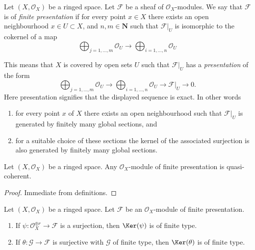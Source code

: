 \begin{definition}
\label{definition-finite-presentation}
Let $(X, \mathcal{O}_X)$ be a ringed space.
Let $\mathcal{F}$ be a sheaf of $\mathcal{O}_X$-modules.
We say that $\mathcal{F}$ is of {\it finite presentation}
if for every point $x \in X$ there exists an open neighbourhood
$x\in U \subset X$, and  $n, m \in \mathbf{N}$ such that $\mathcal{F}|_U$
is isomorphic to the cokernel of a map
$$
\bigoplus\nolimits_{j = 1, \ldots, m}
\mathcal{O}_U
\longrightarrow
\bigoplus\nolimits_{i = 1, \ldots, n}
\mathcal{O}_U
$$
\end{definition}

\noindent
This means that $X$ is covered by open sets $U$
such that $\mathcal{F}|_U$ has a {\it presentation}
of the form
$$
\bigoplus\nolimits_{j = 1, \ldots, m}
\mathcal{O}_U
\longrightarrow
\bigoplus\nolimits_{i = 1, \ldots, n}
\mathcal{O}_U
\to
\mathcal{F}|_U
\to
0.
$$
Here presentation signifies that the displayed
sequence is exact. In other words
\begin{enumerate}
\item for every point $x$ of $X$ there exists
an open neighbourhood such that $\mathcal{F}|_U$
is generated by finitely many global sections, and
\item for a suitable choice of these sections
the kernel of the associated surjection is also
generated by finitely many global sections.
\end{enumerate}

\begin{lemma}
\label{lemma-finite-presentation-quasi-coherent}
Let $(X, \mathcal{O}_X)$ be a ringed space.
Any $\mathcal{O}_X$-module of finite presentation
is quasi-coherent.
\end{lemma}

\begin{proof}
Immediate from definitions.
\end{proof}

\begin{lemma}
\label{lemma-kernel-surjection-finite-free-onto-finite-presentation}
Let $(X, \mathcal{O}_X)$ be a ringed space.
Let $\mathcal{F}$ be an $\mathcal{O}_X$-module of finite presentation.
\begin{enumerate}
\item If $\psi : \mathcal{O}_X^{\oplus r} \to \mathcal{F}$ is a surjection,
then $\Ker(\psi)$ is of finite type.
\item If $\theta : \mathcal{G} \to \mathcal{F}$ is surjective with
$\mathcal{G}$ of finite type, then $\Ker(\theta)$ is of finite type.
\end{enumerate}
\end{lemma}

